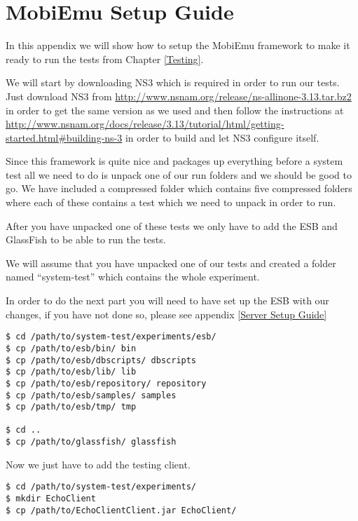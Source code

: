 \section{MobiEmu Setup Guide}\label{MobiEmu Setup Guide}

    In this appendix we will show how to setup the MobiEmu framework to make it ready to run the tests from Chapter \ref{Testing}.

    We will start by downloading NS3 which is required in order to run our tests. Just download NS3 from \url{http://www.nsnam.org/release/ns-allinone-3.13.tar.bz2} in order to get the same version as we used and then follow the instructions at \url{http://www.nsnam.org/docs/release/3.13/tutorial/html/getting-started.html#building-ns-3} in order to build and let NS3 configure itself.

Since this framework is quite nice and packages up everything before a system test all we need to do is unpack one of our run folders and we should be good to go. We have included a compressed folder which contains five compressed folders where each of these contains a test which we need to unpack in order to run.

After you have unpacked one of these tests we only have to add the ESB and GlassFish to be able to run the tests.

We will assume that you have unpacked one of our tests and created a folder named “system-test” which contains the whole experiment.

\begin{shaded}
    In order to do the next part you will need to have set up the ESB with our changes, if you have not done so, please see appendix \ref{Server Setup Guide}
\end{shaded}

\lstset{language=bash, style=shell}
\begin{lstlisting}[frame=single, caption={Copy ESB and GlassFish into System test}, label=mobiemu:copy esb, breaklines=true]
$ cd /path/to/system-test/experiments/esb/
$ cp /path/to/esb/bin/ bin
$ cp /path/to/esb/dbscripts/ dbscripts
$ cp /path/to/esb/lib/ lib
$ cp /path/to/esb/repository/ repository
$ cp /path/to/esb/samples/ samples
$ cp /path/to/esb/tmp/ tmp

$ cd ..
$ cp /path/to/glassfish/ glassfish
\end{lstlisting}


Now we just have to add the testing client.
\lstset{language=bash, style=shell}
\begin{lstlisting}[frame=single, caption={Adding the test client}, label=mobiemu:adding test client, breaklines=true]
$ cd /path/to/system-test/experiments/
$ mkdir EchoClient
$ cp /path/to/EchoClientClient.jar EchoClient/
\end{lstlisting}

